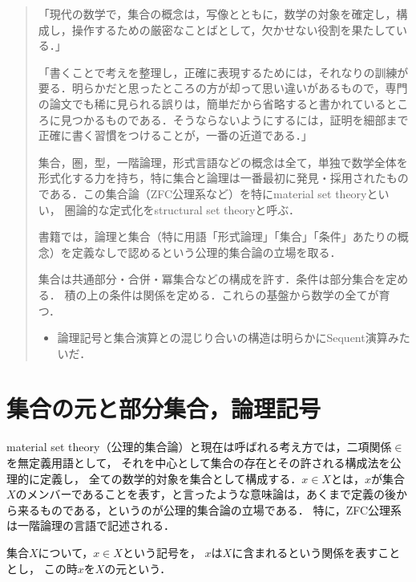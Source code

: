 \documentclass[uplatex,dvipdfmx]{jsreport}
\begin{document}
\begin{quotation}
    「現代の数学で，集合の概念は，写像とともに，数学の対象を確定し，構成し，操作するための厳密なことばとして，欠かせない役割を果たしている．」\cite{斎藤毅}

    「書くことで考えを整理し，正確に表現するためには，それなりの訓練が要る．明らかだと思ったところの方が却って思い違いがあるもので，専門の論文でも稀に見られる誤りは，簡単だから省略すると書かれているところに見つかるものである．そうならないようにするには，証明を細部まで正確に書く習慣をつけることが，一番の近道である．」\cite{斎藤毅}

    集合，圏，型，一階論理，形式言語などの概念は全て，単独で数学全体を形式化する力を持ち，特に集合と論理は一番最初に発見・採用されたものである．この集合論（ZFC公理系など）を特にmaterial set theoryといい，
    圏論的な定式化をstructural set theoryと呼ぶ．

    書籍\cite{斎藤毅}では，論理と集合（特に用語「形式論理」「集合」「条件」あたりの概念）を定義なしで認めるという公理的集合論の立場を取る．

    集合は共通部分・合併・冪集合などの構成を許す．条件は部分集合を定める．
    積の上の条件は関係を定める．これらの基盤から数学の全てが育つ．

    \begin{itemize}
        \item 論理記号と集合演算との混じり合いの構造は明らかにSequent演算みたいだ．
    \end{itemize}
\end{quotation}

\section{集合の元と部分集合，論理記号}

\begin{screen}
    material set theory（公理的集合論）と現在は呼ばれる考え方では，二項関係$\in$を無定義用語として，
    それを中心として集合の存在とその許される構成法を公理的に定義し，
    全ての数学的対象を集合として構成する．$x\in X$とは，$x$が集合$X$のメンバーであることを表す，と言ったような意味論は，あくまで定義の後から来るものである，というのが公理的集合論の立場である．
    特に，ZFC公理系は一階論理の言語で記述される．
\end{screen}

\begin{axiom}[所属関係$\in$]
    集合$X$について，$x\in X$という記号を，
    $x$は$X$に含まれるという関係を表すこととし，
    この時$x$を$X$の元という．
\end{axiom}
\end{document}
